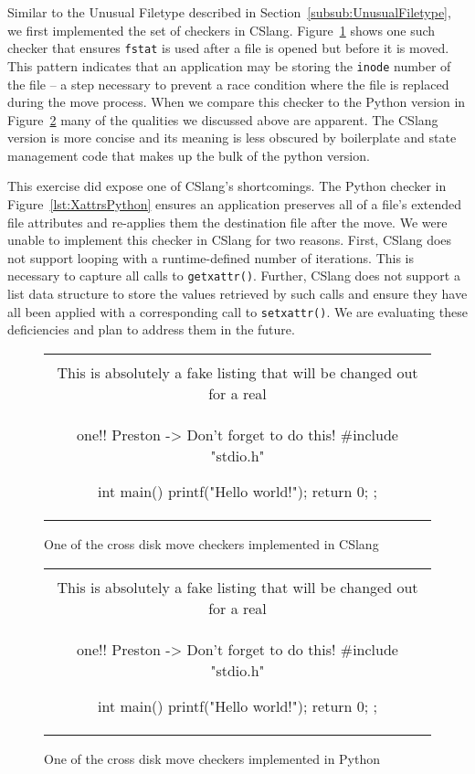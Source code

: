 Similar to the Unusual Filetype described in
Section~\ref{subsub:UnusualFiletype},
we first implemented the
set of checkers in CSlang.  Figure~\ref{lst:Cross-DiskMoveCSlang} shows one
such checker that ensures {\tt fstat} is used after a file is opened but
before it is moved.  This pattern indicates that an application may be
storing the {\tt inode} number of the file -- a step necessary to prevent a race
condition where the file is replaced during the move process.  When
we compare this checker to the Python version in
Figure~\ref{lst:Cross-DiskMovePython} many of the qualities we discussed
above are apparent.  The CSlang version is more concise and its meaning is
less obscured by boilerplate and state management code that makes up the
bulk of the python version.

This exercise did expose one of CSlang's shortcomings.
The Python checker in Figure~\ref{lst:XattrsPython} ensures an application
preserves all of a file's extended file attributes and re-applies them the
destination file after the move.  We were unable to implement this checker
in CSlang for two reasons.  First, CSlang does not support looping with a
runtime-defined number of iterations.  This is necessary to capture all
calls to {\tt getxattr()}.
Further, CSlang does not support a list data structure to store the values
retrieved by such calls and ensure they have all been applied with a
corresponding call to {\tt setxattr()}.
We are evaluating these deficiencies and plan to address them in the
future.

\begin{figure}[H]
\centering
\begin{tabular}{c}
\begin{lstlisting}
\\ This is absolutely a fake listing that will be changed out for a real
\\ one!!  Preston -> Don't forget to do this!
#include "stdio.h"

int main() {
    printf("Hello world!\n");
    return 0;
};
\end{lstlisting}
\end{tabular}
\caption{One of the cross disk move checkers implemented in CSlang}
\label{lst:Cross-DiskMoveCSlang}
\end{figure}


\begin{figure}[H]
\centering
\begin{tabular}{c}
\begin{lstlisting}
\\ This is absolutely a fake listing that will be changed out for a real
\\ one!!  Preston -> Don't forget to do this!
#include "stdio.h"

int main() {
    printf("Hello world!\n");
    return 0;
};
\end{lstlisting}
\end{tabular}
\caption{One of the cross disk move checkers implemented in Python}
\label{lst:Cross-DiskMovePython}
\end{figure}

